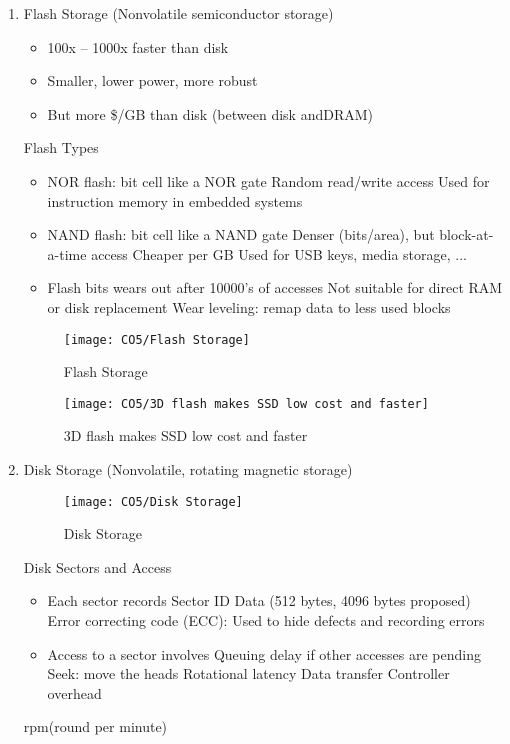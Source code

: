 \begin{enumerate}
\begin{figure}[!htb]
    \end{figure}
    \item Flash Storage (Nonvolatile semiconductor storage)
    \begin{itemize}
        \item 100x – 1000x faster than disk
        \item Smaller, lower power, more robust
        \item But more \$/GB than disk (between disk andDRAM)
    \end{itemize}
    \subitem Flash Types
    \begin{itemize}
        \item  NOR flash: bit cell like a NOR gate
        \subitem Random read/write access
        \subitem Used for instruction memory in embedded systems
        \item NAND flash: bit cell like a NAND gate
        \subitem Denser (bits/area), but block-at-a-time access
        \subitem Cheaper per GB
        \subitem Used for USB keys, media storage, ...
        \item Flash bits wears out after 10000's of accesses
        \subitem Not suitable for direct RAM or disk replacement
        \subitem Wear leveling: remap data to less used blocks
    \end{itemize}
    \begin{figure}[!htb]
        \centering
        \texttt{[image: CO5/Flash Storage]}
        \caption{Flash Storage}
    \end{figure}
    \begin{figure}[!htb]
        \centering
        \texttt{[image: CO5/3D flash makes SSD low cost and faster]}
        \caption{3D flash makes SSD low cost and faster}
    \end{figure}
    \item Disk Storage (Nonvolatile, rotating magnetic storage)
    \begin{figure}[!htb]
        \centering
        \texttt{[image: CO5/Disk Storage]}
        \caption{Disk Storage}
    \end{figure}
    \subitem Disk Sectors and Access
    \begin{itemize}
        \item Each sector records
        \subitem Sector ID
        \subitem Data (512 bytes, 4096 bytes proposed)
        \subitem Error correcting code (ECC): Used to hide defects and recording errors
        \item Access to a sector involves
        \subitem Queuing delay if other accesses are pending
        \subitem Seek: move the heads
        \subitem Rotational latency
        \subitem Data transfer
        \subitem Controller overhead        
    \end{itemize}
    rpm(round per minute)
\end{enumerate}

